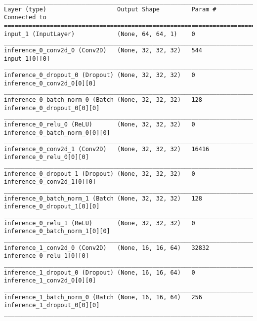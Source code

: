 \begin{lstlisting}[caption={dSprites-\ac{VLAE} Encoder},captionpos=b,basicstyle=\tiny, label={lst:dsprites-vlae-encoder}]
__________________________________________________________________________________________________
Layer (type)                    Output Shape         Param #     Connected to
==================================================================================================
input_1 (InputLayer)            (None, 64, 64, 1)    0
__________________________________________________________________________________________________
inference_0_conv2d_0 (Conv2D)   (None, 32, 32, 32)   544         input_1[0][0]
__________________________________________________________________________________________________
inference_0_dropout_0 (Dropout) (None, 32, 32, 32)   0           inference_0_conv2d_0[0][0]
__________________________________________________________________________________________________
inference_0_batch_norm_0 (Batch (None, 32, 32, 32)   128         inference_0_dropout_0[0][0]
__________________________________________________________________________________________________
inference_0_relu_0 (ReLU)       (None, 32, 32, 32)   0           inference_0_batch_norm_0[0][0]
__________________________________________________________________________________________________
inference_0_conv2d_1 (Conv2D)   (None, 32, 32, 32)   16416       inference_0_relu_0[0][0]
__________________________________________________________________________________________________
inference_0_dropout_1 (Dropout) (None, 32, 32, 32)   0           inference_0_conv2d_1[0][0]
__________________________________________________________________________________________________
inference_0_batch_norm_1 (Batch (None, 32, 32, 32)   128         inference_0_dropout_1[0][0]
__________________________________________________________________________________________________
inference_0_relu_1 (ReLU)       (None, 32, 32, 32)   0           inference_0_batch_norm_1[0][0]
__________________________________________________________________________________________________
inference_1_conv2d_0 (Conv2D)   (None, 16, 16, 64)   32832       inference_0_relu_1[0][0]
__________________________________________________________________________________________________
inference_1_dropout_0 (Dropout) (None, 16, 16, 64)   0           inference_1_conv2d_0[0][0]
__________________________________________________________________________________________________
inference_1_batch_norm_0 (Batch (None, 16, 16, 64)   256         inference_1_dropout_0[0][0]
__________________________________________________________________________________________________

\end{lstlisting}
